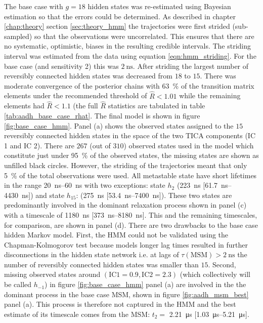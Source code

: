 The base case with $g=18$ hidden states was re-estimated using Bayesian estimation so that the errors could be determined. As described in chapter \ref{chap:theory} section \ref{sec:theory_hmm} the trajectories were first  strided (sub-sampled) so that the observations were uncorrelated. This ensures that there are no systematic, optimistic,  biases in the resulting credible intervals. The striding interval was estimated from the data using  equation \ref{eqn:hmm_striding}. For the base case (and sensitivity 2) this was $\SI{2}{\nano\second}$. After striding the largest number of reversibly connected hidden states was decreased from $18$ to $15$. There was moderate convergence of the posterior chains with \SI{63}{\percent} of the transition matrix elements under the recommended threshold of $\hat{R}<1.01$ while the remaining elements had $\hat{R}<1.1$ (the full $\hat{R}$ statistics  are tabulated in table \ref{tab:aadh_base_case_rhat}.  The final model is shown in figure \ref{fig:base_case_hmm}. Panel (a) shows the observed states assigned to the $15$ reversibly connected hidden states in the space of the two TICA components (IC 1 and IC 2). There are $267$ (out of $310$) observed states  used in the model which constitute just under \SI{95}{\percent} of the observed states, the missing states are shown as unfilled black circles. However, the striding of the trajectories meant that only \SI{5}{\percent} of the total observations were used. All metastable state have short lifetimes in the range \SIrange{20}{60}{\nano\second} with two exceptions: state $h_2$ (\SI{223}{\nano\second} [\SIrange[range-phrase=-]{61.7}{4430}{\nano\second}]) and state $h_{15}$: (\SI{275}{\nano\second} [\SIrange[range-phrase=-]{53.4}{7400}{\nano\second}]). These two states are predominantly involved in the dominant relaxation process shown in panel (c) with a timescale of \SI{1180}{\nano\second} [\SIrange[range-phrase=-]{373}{8180}{\nano\second}]. This and the remaining timescales,  for comparison,  are shown in panel (d). 
There are two drawbacks to the base case hidden Markov model. First, the HMM could not be validated using the Chapman-Kolmogorov test because models longer lag times resulted in further disconnections in the hidden state network i.e. at lags of $\tau(\mathrm{MSM})> \SI{2}{\nano\second}$ the number of reversibly connected hidden states was smaller than $15$. Second, missing observed states around $(\mathrm{IC 1}=0.9, \mathrm{IC 2}=2.3)$ (which collectively will be called $h_{-1}$) in figure \ref{fig:base_case_hmm} panel (a) are involved in the the dominant process in the  base case MSM, shown in figure \ref{fig:aadh_msm_best} panel (a). This process is therefore not captured in the HMM and the best estimate of its timescale comes from the MSM: $t_2 =$ \SI{2.21}{\micro\second} [\SIrange[range-phrase=-]{1.03}{5.21}{\micro\second}].
